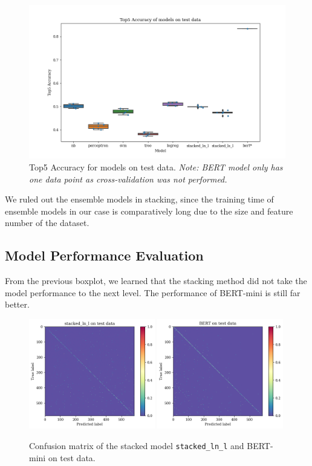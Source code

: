 \documentclass[
	a4paper,
	fontsize=10pt, %
	twoside=false, %
	secnumdepth=2, %
]{kaohandt}
\begin{document}
\begin{figure}[h]
	\includegraphics{metric_test_score}
	\caption{Top5 Accuracy for models on test data. \emph{Note: BERT model only has one data point as cross-validation was not performed.}}
	\label{fig:acc_test}
\end{figure}

We ruled out the ensemble models in stacking, since the training time of ensemble models in our case is comparatively long due to the size and feature number of the dataset.

\subsection{Model Performance Evaluation}

From the previous boxplot, we learned that the stacking method did not take the model performance to the next level. The performance of BERT-mini is still far better.

\begin{figure}[h]
	\includegraphics[width=0.49\textwidth]{confusion_matrix_stacked_ln_l_test}
	\includegraphics[width=0.49\textwidth]{confusion_matrix_bert_test}
	\caption{Confusion matrix of the stacked model \texttt{stacked\_ln\_l} and BERT-mini on test data.}
	\label{fig:conf_mat}
\end{figure}
\end{document}
